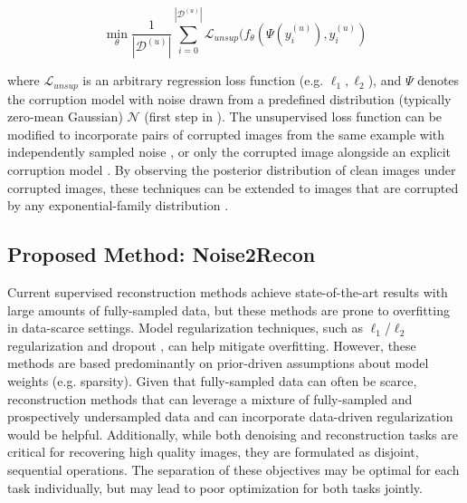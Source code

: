 \documentclass[10pt,twocolumn,letterpaper]{article}
\newcommand{\RV}[1]{{#1}}
\begin{document}
\RV{
\begin{equation}
    \min_{\theta} \frac{1}{|\mathcal{D}^{(u)}|} \sum_{i=0}^{|\mathcal{D}^{(u)}|} \mathcal{L}_{unsup}(f_{\theta}(\Psi(y^{(u)}_i), y^{(u)}_i)
\end{equation}
}

where $\mathcal{L}_{\RV{unsup}}$ is an arbitrary regression loss function (e.g. $\ell_1, \ell_2$), and $\Psi$ denotes the corruption model with noise drawn from a predefined distribution (typically zero-mean Gaussian) $\mathcal{N}$ (\RV{first step in \cite{moran2020noisier2noise}}). The unsupervised loss function can be modified to incorporate pairs of corrupted images from the same example with independently sampled noise \cite{lehtinen2018noise2noise}, or only the corrupted image alongside an explicit corruption model \cite{batson2019noise2self}. \RV{By observing the posterior distribution of clean images under corrupted images, these techniques can be extended to images that are corrupted by any exponential-family distribution \cite{kim2021noise2score}.}

\subsection{Proposed Method: Noise2Recon}
\label{sec:method-n2r}
Current supervised reconstruction methods achieve state-of-the-art results with large amounts of fully-sampled data, but these methods are prone to overfitting in data-scarce settings. Model regularization techniques, such as $\ell_1$/$\ell_2$ regularization and dropout \cite{srivastava2014dropout}, can help mitigate overfitting. However, these methods are based predominantly on prior-driven assumptions about model weights (e.g. sparsity). Given that fully-sampled data can often be scarce, reconstruction methods that can leverage a mixture of fully-sampled and prospectively undersampled data and \RV{can incorporate} data-driven regularization would be helpful. Additionally, while both denoising and reconstruction tasks are critical for recovering high quality images, they are formulated as disjoint, sequential operations. The separation of these objectives may be optimal for each task individually, but may lead to poor optimization for both tasks jointly.
\end{document}

